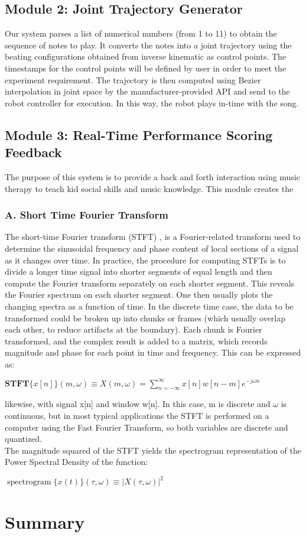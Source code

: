 \subsection{Module 2: Joint Trajectory Generator}
Our system parses a list of numerical numbers (from 1 to 11) to obtain the sequence
of notes to play. It converts the notes into a joint trajectory using the beating
configurations obtained from inverse kinematic as control points. The timestamps
for the control points will be defined by user in order to meet the experiment requirement.
The trajectory is then computed using Bezier interpolation in joint space by the
manufacturer-provided API and send to the robot controller for execution. In this
way, the robot plays in-time with the song.\\

\subsection{Module 3: Real-Time Performance Scoring Feedback}
The purpose of this system is to provide a back and forth interaction using music 
therapy to teach kid social skills and music knowledge. This module creates the 

\subsubsection{A. Short Time Fourier Transform}
The short-time Fourier transform (STFT) , is a Fourier-related 
transform used to determine the sinusoidal frequency and phase content of local 
sections of a signal as it changes over time. In practice, the procedure for 
computing STFTs is to divide a longer time signal into shorter segments of equal 
length and then compute the Fourier transform separately on each shorter segment. 
This reveals the Fourier spectrum on each shorter segment. One then usually plots 
the changing spectra as a function of time.
In the discrete time case, the data to be transformed could be broken up into chunks 
or frames (which usually overlap each other, to reduce artifacts at the boundary). 
Each chunk is Fourier transformed, and the complex result is added to a matrix, which 
records magnitude and phase for each point in time and frequency. This can be expressed as:

${\displaystyle \mathbf {STFT} \{x[n]\}(m,\omega )\equiv X(m,\omega )=\sum _{n=-\infty }^{\infty }x[n]w[n-m]e^{-j\omega n}}$

likewise, with signal x[n] and window w[n]. In this case, m is discrete and $\omega$ 
is continuous, but in most typical applications the STFT is performed on a computer 
using the Fast Fourier Transform, so both variables are discrete and quantized.\\
The magnitude squared of the STFT yields the spectrogram representation of the Power Spectral Density of the function:

${\displaystyle \operatorname {spectrogram} \{x(t)\}(\tau ,\omega )\equiv |X(\tau ,\omega )|^{2}}$


\section{Summary}

